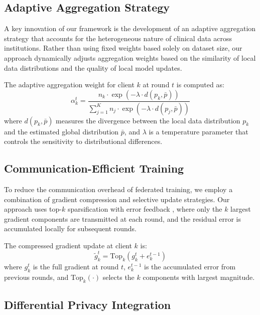 \documentclass[12pt,letterpaper]{article}
\begin{document}
\subsection{Adaptive Aggregation Strategy}

A key innovation of our framework is the development of an adaptive aggregation strategy that accounts for the heterogeneous nature of clinical data across institutions. Rather than using fixed weights based solely on dataset size, our approach dynamically adjusts aggregation weights based on the similarity of local data distributions and the quality of local model updates.

The adaptive aggregation weight for client $k$ at round $t$ is computed as:
\begin{equation}
\alpha_k^t = \frac{n_k \cdot \exp(-\lambda \cdot d(p_k, \bar{p}))}{\sum_{j=1}^{K} n_j \cdot \exp(-\lambda \cdot d(p_j, \bar{p}))}
\label{eq:adaptive}
\end{equation}
where $d(p_k, \bar{p})$ measures the divergence between the local data distribution $p_k$ and the estimated global distribution $\bar{p}$, and $\lambda$ is a temperature parameter that controls the sensitivity to distributional differences.

\subsection{Communication-Efficient Training}

To reduce the communication overhead of federated training, we employ a combination of gradient compression and selective update strategies. Our approach uses top-$k$ sparsification with error feedback \citep{Stich2018}, where only the $k$ largest gradient components are transmitted at each round, and the residual error is accumulated locally for subsequent rounds.

The compressed gradient update at client $k$ is:
\begin{equation}
\tilde{g}_k^t = \text{Top}_k(g_k^t + e_k^{t-1})
\end{equation}
where $g_k^t$ is the full gradient at round $t$, $e_k^{t-1}$ is the accumulated error from previous rounds, and $\text{Top}_k(\cdot)$ selects the $k$ components with largest magnitude.

\subsection{Differential Privacy Integration}
\end{document}
